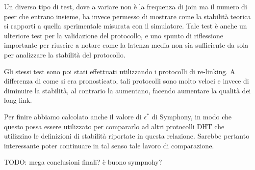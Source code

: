 \documentclass[prodmode,acmtap]{acmlarge}
\begin{document}
Un diverso tipo di test, dove a variare non è la frequenza di join ma il numero di peer che entrano insieme, ha invece permesso di mostrare come la stabilità teorica si rapporti a quella sperimentale misurata con il simulatore. Tale test è anche un ulteriore test per la validazione del protocollo, e uno spunto di riflessione importante per riuscire a notare come la latenza media non sia sufficiente da sola per analizzare la stabilità del protocollo.

Gli stessi test sono poi stati effettuati utilizzando i protocolli di re-linking. A differenza di come si era pronosticato, tali protocolli sono molto veloci e invece di diminuire la stabilità, al contrario la aumentano, facendo aumentare la qualità dei long link.

Per finire abbiamo calcolato anche il valore di $\epsilon^*$ di Symphony, in modo che questo possa essere utilizzato per compararlo ad altri protocolli DHT che utilizzino le definizioni di stabilità riportate in questa relazione. Sarebbe pertanto interessante poter continuare in tal senso tale lavoro di comparazione.

TODO: mega conclusioni finali? è buono sympnohy?

























\end{document}
